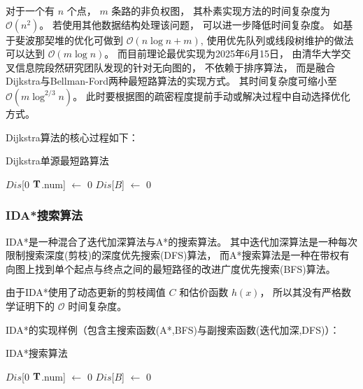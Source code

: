 \documentclass[12pt,a4paper,oneside,UTF8]{ctexart}
\begin{document}
对于一个有 $n$ 个点，
$m$ 条路的非负权图，
其朴素实现方法的时间复杂度为 $\mathcal{O}(n^2)$。
若使用其他数据结构处理该问题，
可以进一步降低时间复杂度。
如基于斐波那契堆的优化可做到 $\mathcal{O}(n \log n + m)$,
使用优先队列或线段树维护的做法可以达到 $\mathcal{O}(m \log n)$。
而目前理论最优实现为2025年6月15日，
由清华大学交叉信息院段然研究团队发现的针对无向图的，
不依赖于排序算法，
而是融合Dijkstra与Bellman-Ford两种最短路算法的实现方式。
其时间复杂度可缩小至 $\mathcal{O}(m \log ^{2/3} n)$\cite{ref5}。
此时要根据图的疏密程度提前手动或解决过程中自动选择优化方式。

Dijkstra算法的核心过程如下：

\begin{algorithm}[H]
  \caption{Dijkstra单源最短路算法}\label{algorithm-traditional-Dijkstra}

  $Dis$[$0$ \KwTo $\bf{T}$.num] $\leftarrow$ 0\;
  $Dis$[$B$] $\leftarrow$ 0\;
\end{algorithm}

\subsubsection{IDA*搜索算法}
IDA*是一种混合了迭代加深算法与A*的搜索算法。
其中迭代加深算法是一种每次限制搜索深度(剪枝)的深度优先搜索(DFS)算法，
而A*搜索算法是一种在带权有向图上找到单个起点与终点之间的最短路径的改进广度优先搜索(BFS)算法。

由于IDA*使用了动态更新的剪枝阈值 $C$ 和估价函数 $h(x)$，
所以其没有严格数学证明下的 $\mathcal{O}$ 时间复杂度。

IDA*的实现样例（包含主搜索函数(A*,BFS)与副搜索函数(迭代加深,DFS)）：

\begin{algorithm}[H]
  \caption{IDA*搜索算法}\label{algorithm-traditional-IDAstar}

  $Dis$[$0$ \KwTo $\bf{T}$.num] $\leftarrow$ 0\;
  $Dis$[$B$] $\leftarrow$ 0\;
\end{algorithm}
\end{document}
